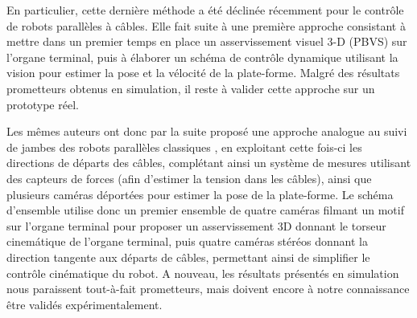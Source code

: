 En particulier, cette derni\`ere m\'ethode a \'et\'e d\'eclin\'ee r\'ecemment
pour le contr\^ole de robots parall\`eles \`a c\^ables. Elle fait suite \`a
une premi\`ere approche \cite{conf/iros/DallejGAMM11} consistant \`a mettre dans
un premier temps en place un asservissement visuel 3-D (PBVS) sur l'organe
terminal, puis \`a \'elaborer un sch\'ema de contr\^ole dynamique utilisant la
vision pour estimer la pose et la v\'elocit\'e de la plate-forme. Malgr\'e des
r\'esultats prometteurs obtenus en simulation, il reste \`a valider cette
approche sur un prototype r\'eel.

Les m\^emes auteurs ont donc par la suite propos\'e une approche analogue au
suivi de jambes des robots parall\`eles classiques \cite{dallej2012}, en
exploitant cette fois-ci les directions de d\'eparts des c\^ables, compl\'etant
ainsi un syst\`eme de mesures utilisant des capteurs de forces (afin d'estimer
la tension dans les c\^ables), ainsi que plusieurs cam\'eras d\'eport\'ees pour
estimer la pose de la plate-forme. Le sch\'ema d'ensemble utilise donc un 
premier ensemble de quatre cam\'eras filmant un motif sur l'organe terminal pour
proposer un asservissement 3D donnant le torseur cinem\'atique de l'organe
terminal, puis quatre cam\'eras st\'er\'eos donnant la direction tangente aux
d\'eparts de c\^ables, permettant ainsi de simplifier le contr\^ole
cin\'ematique du robot. A nouveau, les r\'esultats pr\'esent\'es en simulation
nous paraissent tout-\`a-fait prometteurs, mais doivent encore \`a notre
connaissance \^etre valid\'es exp\'erimentalement.

